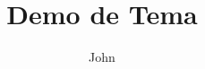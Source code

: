 \documentclass{beamer}
\title{Demo de Tema}
\author{John}
\begin{document}
\begin{frame}
\titlepage
\end{frame}
\end{document}
